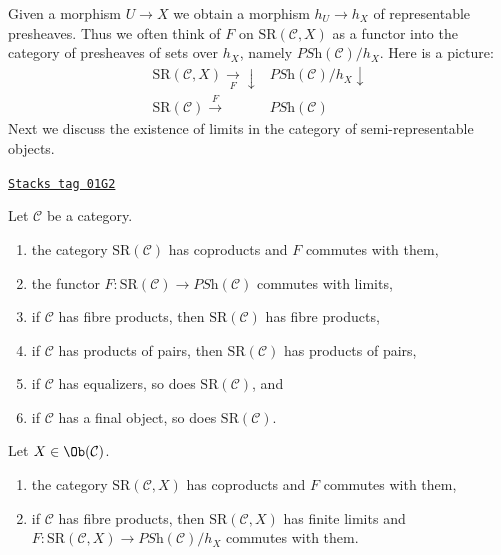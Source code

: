 Given a morphism $U \to X$ we obtain a morphism $h_U \to h_X$ of representable
presheaves. Thus we often think of $F$ on $\text{SR}(\mathcal{C}, X)$
as a functor into the category of presheaves of sets over $h_X$,
namely $\textit{PSh}(\mathcal{C})/h_X$. Here is a picture:
$$
\begin{array}{cc}\text{SR}(\mathcal{C}, X) \underset{F}{\longrightarrow}\downarrow & \textit{PSh}(\mathcal{C})/h_X \downarrow \\ \text{SR}(\mathcal{C}) \overset{F}{\longrightarrow} & \textit{PSh}(\mathcal{C})\end{array}
$$
Next we discuss the existence of limits in the category of semi-representable
objects.

\begin{lemma}
\label{hypercovering-lemma-coprod-prod-SR}
\href{https://stacks.math.columbia.edu/tag/01G2}{\texttt{Stacks tag 01G2}}

Let $\mathcal{C}$ be a category.
\begin{enumerate}
\item the category $\text{SR}(\mathcal{C})$ has coproducts
and $F$ commutes with them,
\item the functor $F : \text{SR}(\mathcal{C}) \to \textit{PSh}(\mathcal{C})$
commutes with limits,
\item if $\mathcal{C}$ has fibre products, then $\text{SR}(\mathcal{C})$
has fibre products,
\item if $\mathcal{C}$ has products of pairs, then
$\text{SR}(\mathcal{C})$ has products of pairs,
\item if $\mathcal{C}$ has equalizers, so does $\text{SR}(\mathcal{C})$, and
\item if $\mathcal{C}$ has a final object, so does $\text{SR}(\mathcal{C})$.
\end{enumerate}
Let $X \in \Ob(\mathcal{C})$.
\begin{enumerate}
\item the category $\text{SR}(\mathcal{C}, X)$ has coproducts
and $F$ commutes with them,
\item if $\mathcal{C}$ has fibre products, then $\text{SR}(\mathcal{C}, X)$
has finite limits and
$F : \text{SR}(\mathcal{C}, X) \to \textit{PSh}(\mathcal{C})/h_X$
commutes with them.
\end{enumerate}
\end{lemma}

